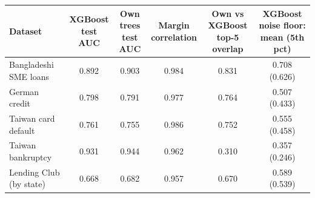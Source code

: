 \begin{tabular}{lccccc}
\toprule
Dataset & \makecell{XGBoost\\test AUC} & \makecell{Own trees\\test AUC} & \makecell{Margin\\correlation} & \makecell{Own vs XGBoost\\top-5 overlap} & \makecell{XGBoost noise floor:\\mean (5th pct)} \\
\midrule
Bangladeshi SME loans & 0.892 & 0.903 & 0.984 & 0.831 & 0.708 (0.626) \\
German credit & 0.798 & 0.791 & 0.977 & 0.764 & 0.507 (0.433) \\
Taiwan card default & 0.761 & 0.755 & 0.986 & 0.752 & 0.555 (0.458) \\
Taiwan bankruptcy & 0.931 & 0.944 & 0.962 & 0.310 & 0.357 (0.246) \\
Lending Club (by state) & 0.668 & 0.682 & 0.957 & 0.670 & 0.589 (0.539) \\
\bottomrule
\end{tabular}
